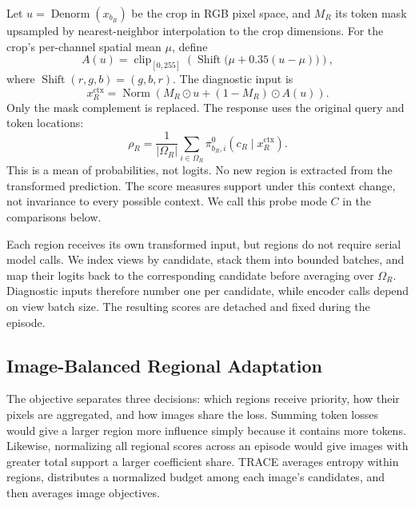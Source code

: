 \documentclass[letterpaper]{article}
\begin{document}
Let $u=\operatorname{Denorm}(x_{b_R})$ be the crop in RGB pixel space, and $M_R$ its token mask upsampled by nearest-neighbor interpolation to the crop dimensions. For the crop's per-channel spatial mean $\mu$, define
\begin{equation}
A(u)=\operatorname{clip}_{[0,255]}
\left(\operatorname{Shift}\bigl(\mu+0.35(u-\mu)\bigr)\right),
\end{equation}
where $\operatorname{Shift}(r,g,b)=(g,b,r)$. The diagnostic input is
\begin{equation}
x_R^{\mathrm{ctx}}=\operatorname{Norm}
\left(M_R\odot u+(1-M_R)\odot A(u)\right).
\label{eq:context-view}
\end{equation}
Only the mask complement is replaced. The response uses the original query and token locations:
\begin{equation}
\rho_R=\frac{1}{|\Omega_R|}\sum_{i\in\Omega_R}
\pi^0_{b_R,i}(c_R\mid x_R^{\mathrm{ctx}}).
\label{eq:support}
\end{equation}
This is a mean of probabilities, not logits. No new region is extracted from the transformed prediction. The score measures support under this context change, not invariance to every possible context. We call this probe mode $C$ in the comparisons below.

Each region receives its own transformed input, but regions do not require serial model calls. We index views by candidate, stack them into bounded batches, and map their logits back to the corresponding candidate before averaging over $\Omega_R$. Diagnostic inputs therefore number one per candidate, while encoder calls depend on view batch size. The resulting scores are detached and fixed during the episode.

\subsection{Image-Balanced Regional Adaptation}
The objective separates three decisions: which regions receive priority, how their pixels are aggregated, and how images share the loss. Summing token losses would give a larger region more influence simply because it contains more tokens. Likewise, normalizing all regional scores across an episode would give images with greater total support a larger coefficient share. TRACE averages entropy within regions, distributes a normalized budget among each image's candidates, and then averages image objectives.
\end{document}
